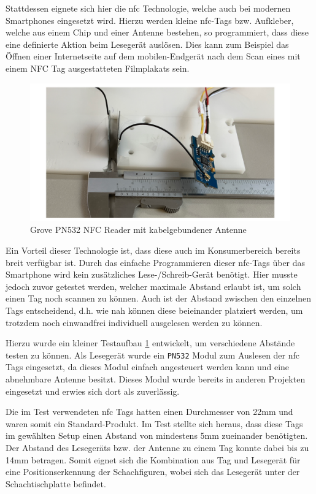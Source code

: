 Stattdessen eignete sich hier die \gls{nfc} Technologie, welche auch bei
modernen Smartphones eingesetzt wird. Hierzu werden kleine
\gls{nfc}-Tags bzw. Aufkleber, welche aus einem Chip und einer Antenne
bestehen, so programmiert, dass diese eine definierte Aktion beim
Lesegerät auslösen. Dies kann zum Beispiel das Öffnen einer
Internetseite auf dem mobilen-Endgerät nach dem Scan eines mit einem NFC
Tag ausgestatteten Filmplakats sein.

\begin{figure}
\centering
\includegraphics{images/ATC_nfc_range_test.png}
\caption{Grove PN532 NFC Reader mit kabelgebundener Antenne
\label{ATC_nfc_range_test}}
\end{figure}

Ein Vorteil dieser Technologie ist, dass diese auch im Konsumerbereich
bereits breit verfügbar ist. Durch das einfache Programmieren dieser
\gls{nfc}-Tags über das Smartphone wird kein zusätzliches
Lese-/Schreib-Gerät benötigt. Hier musste jedoch zuvor getestet werden,
welcher maximale Abstand erlaubt ist, um solch einen Tag noch scannen zu
können. Auch ist der Abstand zwischen den einzelnen Tags entscheidend,
d.h. wie nah können diese beieinander platziert werden, um trotzdem noch
einwandfrei individuell ausgelesen werden zu können.

Hierzu wurde ein kleiner Testaufbau \ref{ATC_nfc_range_test} entwickelt,
um verschiedene Abstände testen zu können. Als Lesegerät wurde ein
\passthrough{\lstinline!PN532!} Modul zum Auslesen der \gls{nfc} Tags
eingesetzt, da dieses Modul einfach angesteuert werden kann und eine
abnehmbare Antenne besitzt. Dieses Modul wurde bereits in anderen
Projekten eingesetzt und erwies sich dort als zuverlässig.

Die im Test verwendeten \gls{nfc} Tags hatten einen Durchmesser von 22mm
und waren somit ein Standard-Produkt. Im Test stellte sich heraus, dass
diese Tags im gewählten Setup einen Abstand von mindestens 5mm
zueinander benötigten. Der Abstand des Lesegeräts bzw. der Antenne zu
einem Tag konnte dabei bis zu 14mm betragen. Somit eignet sich die
Kombination aus Tag und Lesegerät für eine Positionserkennung der
Schachfiguren, wobei sich das Lesegerät unter der Schachtischplatte
befindet.

